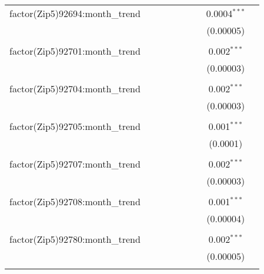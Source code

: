 \begin{table}[H]
{\begin{tabular}{@{\extracolsep{5pt}}lcccccccc}
  factor(Zip5)92694:month\_trend &  &  &  &  &  &  & 0.0004$^{***}$ &  \\  

   &  &  &  &  &  &  & (0.00005) &  \\  

   & & & & & & & & \\  

  factor(Zip5)92701:month\_trend &  &  &  &  &  &  & 0.002$^{***}$ &  \\  

   &  &  &  &  &  &  & (0.00003) &  \\  

   & & & & & & & & \\  

  factor(Zip5)92704:month\_trend &  &  &  &  &  &  & 0.002$^{***}$ &  \\  

   &  &  &  &  &  &  & (0.00003) &  \\  

   & & & & & & & & \\  

  factor(Zip5)92705:month\_trend &  &  &  &  &  &  & 0.001$^{***}$ &  \\  

   &  &  &  &  &  &  & (0.0001) &  \\  

   & & & & & & & & \\  

  factor(Zip5)92707:month\_trend &  &  &  &  &  &  & 0.002$^{***}$ &  \\  

   &  &  &  &  &  &  & (0.00003) &  \\  

   & & & & & & & & \\  

  factor(Zip5)92708:month\_trend &  &  &  &  &  &  & 0.001$^{***}$ &  \\  

   &  &  &  &  &  &  & (0.00004) &  \\  

   & & & & & & & & \\  

  factor(Zip5)92780:month\_trend &  &  &  &  &  &  & 0.002$^{***}$ &  \\  

   &  &  &  &  &  &  & (0.00005) &  \\  

   & & & & & & & & \\  


\end{tabular}}
\end{table}
